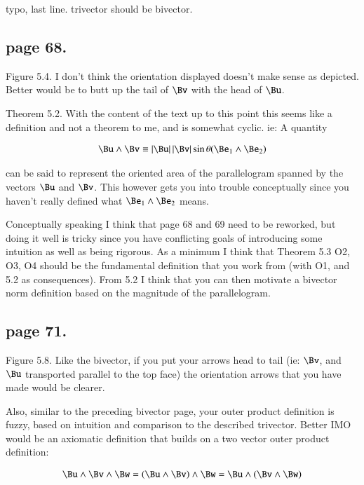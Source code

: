 \documentclass{article}
\begin{document}
typo, last line.  trivector should be bivector.

\subsection{page 68. }

Figure 5.4.  I don't think the orientation displayed doesn't make sense as depicted.  Better would be to butt up the tail of $\Bv$ with the head of $\Bu$.

Theorem 5.2.  With the content of the text up to this point this seems like a
definition and not a theorem to me, and is somewhat cyclic.  ie: A quantity

\begin{align*}
\Bu \wedge \Bv \equiv \Abs{\Bu} \Abs{\Bv} \sin \theta (\Be_1 \wedge \Be_2)
\end{align*}

can be said to represent the oriented area of the parallelogram spanned by the
vectors $\Bu$ and $\Bv$.  This however gets you into trouble conceptually
since you haven't really defined what $\Be_1 \wedge \Be_2$ means.

Conceptually speaking I think that page 68 and 69 need to be reworked, but
doing it well is tricky since you have conflicting goals of introducing some
intuition as well as being rigorous.  As a minimum I think that Theorem 5.3
O2, O3, O4 should be the fundamental definition that you work from (with O1,
and 5.2 as consequences).  From 5.2 I think that you can then motivate a
bivector norm definition based on the magnitude of the parallelogram.

\subsection{page 71. }

Figure 5.8.  Like the bivector, if you put your arrows head to tail (ie: $\Bv$, and $\Bu$ transported parallel to the top face) the orientation arrows that
you have made would be clearer.

Also, similar to the preceding bivector page, your outer product definition is 
fuzzy, based on intuition and comparison to the described trivector.  Better
IMO would be an axiomatic definition that builds on a two vector outer product definition:

\begin{align*}
\Bu \wedge \Bv \wedge \Bw &= (\Bu \wedge \Bv) \wedge \Bw = \Bu \wedge (\Bv \wedge \Bw) \\
\end{align*}
\end{document}
